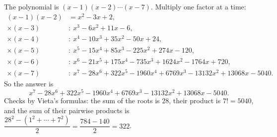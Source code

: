 The polynomial is $(x-1)(x-2)\cdots(x-7)$. Multiply one factor at a time:
\begin{align*}
(x-1)(x-2)&=x^2-3x+2,\\
\times(x-3)&:\ x^3-6x^2+11x-6,\\
\times(x-4)&:\ x^4-10x^3+35x^2-50x+24,\\
\times(x-5)&:\ x^5-15x^4+85x^3-225x^2+274x-120,\\
\times(x-6)&:\ x^6-21x^5+175x^4-735x^3+1624x^2-1764x+720,\\
\times(x-7)&:\ x^7-28x^6+322x^5-1960x^4+6769x^3-13132x^2+13068x-5040.
\end{align*}
So the answer is
\[\boxed{x^7-28x^6+322x^5-1960x^4+6769x^3-13132x^2+13068x-5040}.\]
Checks by Vieta's formulas: the sum of the roots is $28$, their product is $7!=5040$, and the sum of their pairwise products is $\dfrac{28^2-(1^2+\cdots+7^2)}{2}=\dfrac{784-140}2=322$.
